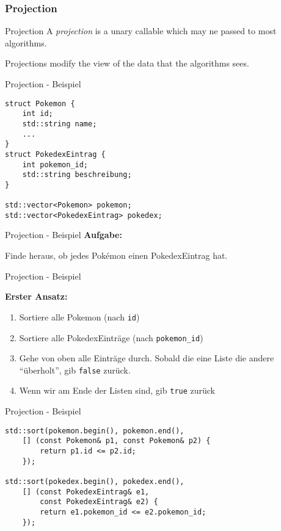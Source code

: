 \subsubsection{Projection}

\begin{frame}{Projection}
    A \emph{projection} is a unary callable which may ne passed to most algorithms.

    \vspace{2.5em}

    Projections modify the view of the data that the algorithms sees.
\end{frame}

\begin{frame}[fragile]{Projection - Beispiel}
    \begin{verbatim}
struct Pokemon {
    int id;
    std::string name;
    ...
}
struct PokedexEintrag {
    int pokemon_id;
    std::string beschreibung;
}

std::vector<Pokemon> pokemon;
std::vector<PokedexEintrag> pokedex;
    \end{verbatim}
\end{frame}

\begin{frame}{Projection - Beispiel}
    \textbf{Aufgabe:}

    Finde heraus, ob jedes Pokémon einen PokedexEintrag hat.
\end{frame}

\begin{frame}{Projection - Beispiel}
    \begin{center}
        \textbf{Erster Ansatz:}
    \end{center}
    \begin{enumerate}
        \item Sortiere alle Pokemon (nach \texttt{id})
        \item Sortiere alle PokedexEinträge (nach \texttt{pokemon\_id})
        \item Gehe von oben alle Einträge durch.
              Sobald die eine Liste die andere \enquote{überholt}, gib \texttt{false} zurück.
        \item Wenn wir am Ende der Listen sind, gib \texttt{true} zurück
    \end{enumerate}
\end{frame}

\begin{frame}[fragile]{Projection - Beispiel}
    \begin{verbatim}
std::sort(pokemon.begin(), pokemon.end(),
    [] (const Pokemon& p1, const Pokemon& p2) {
        return p1.id <= p2.id;
    });

std::sort(pokedex.begin(), pokedex.end(),
    [] (const PokedexEintrag& e1,
        const PokedexEintrag& e2) {
        return e1.pokemon_id <= e2.pokemon_id;
    });
    \end{verbatim}
\end{frame}

